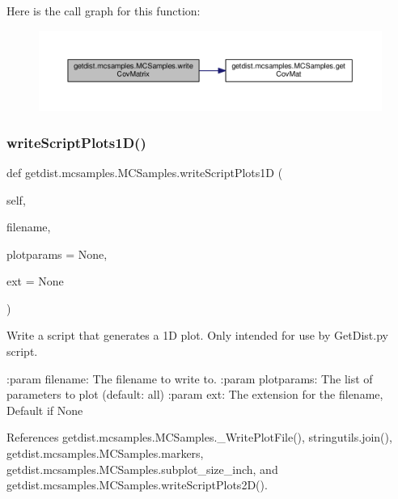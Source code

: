 Here is the call graph for this function\+:
\nopagebreak
\begin{figure}[H]
\begin{center}
\leavevmode
\includegraphics[width=350pt]{classgetdist_1_1mcsamples_1_1MCSamples_ac0630cea17b369b81474a446073d8604_cgraph}
\end{center}
\end{figure}
\mbox{\label{classgetdist_1_1mcsamples_1_1MCSamples_a658aa2c258861d420985ec8065481efa}} 
\subsubsection{\texorpdfstring{write\+Script\+Plots1\+D()}{writeScriptPlots1D()}}
{\footnotesize\ttfamily def getdist.\+mcsamples.\+M\+C\+Samples.\+write\+Script\+Plots1D (\begin{DoxyParamCaption}\item[{}]{self,  }\item[{}]{filename,  }\item[{}]{plotparams = {\ttfamily None},  }\item[{}]{ext = {\ttfamily None} }\end{DoxyParamCaption})}

\begin{DoxyVerb}Write a script that generates a 1D plot. Only intended for use by GetDist.py script.

:param filename: The filename to write to.
:param plotparams: The list of parameters to plot (default: all)
:param ext: The extension for the filename, Default if None
\end{DoxyVerb}
 

References getdist.\+mcsamples.\+M\+C\+Samples.\+\_\+\+Write\+Plot\+File(), stringutils.\+join(), getdist.\+mcsamples.\+M\+C\+Samples.\+markers, getdist.\+mcsamples.\+M\+C\+Samples.\+subplot\+\_\+size\+\_\+inch, and getdist.\+mcsamples.\+M\+C\+Samples.\+write\+Script\+Plots2\+D().

